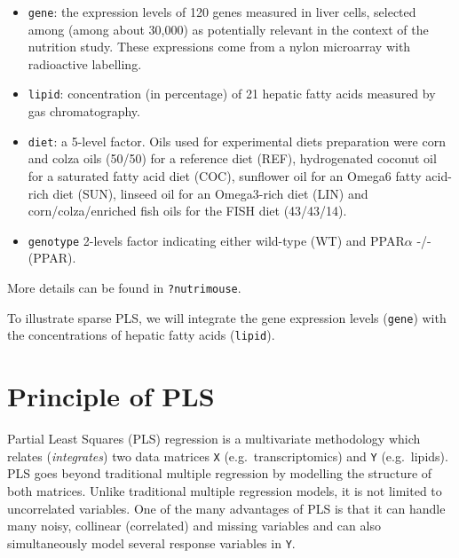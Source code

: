 \documentclass[]{book}
\begin{document}
\begin{itemize}
\item
  \texttt{gene}: the expression levels of 120 genes measured in liver cells, selected among (among about 30,000) as potentially relevant in the context of the nutrition study. These expressions come from a nylon microarray with radioactive labelling.
\item
  \texttt{lipid}: concentration (in percentage) of 21 hepatic fatty acids measured by gas chromatography.
\item
  \texttt{diet}: a 5-level factor. Oils used for experimental diets preparation were corn and colza oils (50/50) for a reference diet (REF), hydrogenated coconut oil for a saturated fatty acid diet (COC), sunflower oil for an Omega6 fatty acid-rich diet (SUN), linseed oil for an Omega3-rich diet (LIN) and corn/colza/enriched fish oils for the FISH diet (43/43/14).
\item
  \texttt{genotype} 2-levels factor indicating either wild-type (WT) and PPAR\(\alpha\) -/- (PPAR).
\end{itemize}

More details can be found in \texttt{?nutrimouse}.

To illustrate sparse PLS, we will integrate the gene expression levels (\texttt{gene}) with the concentrations of hepatic fatty acids (\texttt{lipid}).

\hypertarget{principle-of-pls}{%
\section{Principle of PLS}\label{principle-of-pls}}

Partial Least Squares (PLS) regression \citep{Wol66, Wol01} is a multivariate methodology which relates (\textit{integrates}) two data matrices \texttt{X} (e.g.~transcriptomics) and \texttt{Y} (e.g.~lipids). PLS goes beyond traditional multiple regression by modelling the structure of both matrices. Unlike traditional multiple regression models, it is not limited to uncorrelated variables. One of the many advantages of PLS is that it can handle many noisy, collinear (correlated) and missing variables and can also simultaneously model several response variables in \texttt{Y}.
\end{document}
